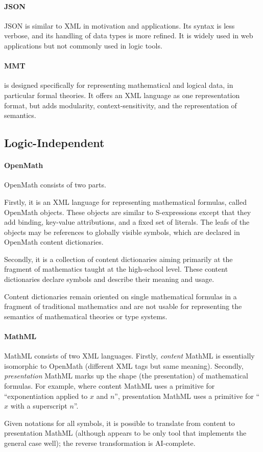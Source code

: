 \documentclass[12pt]{article}
\newcommand{\system}[2][]{\paragraph{#2}#2 \ifnonempty[\cite{#2}]{#1}{\cite{#1}}}
\begin{document}
\system{JSON}
is similar to XML in motivation and applications.
Its syntax is less verbose, and its handling of data types is more refined.
It is widely used in web applications but not commonly used in logic tools.

\paragraph{MMT}
\mmt is designed specifically for representing mathematical and logical data, in particular formal theories.
It offers an XML language as one representation format, but adds modularity, context-sensitivity, and the representation of semantics.

\subsection{Logic-Independent}

\system{OpenMath} consists of two parts.

Firstly, it is an XML language for representing mathematical formulas, called OpenMath objects.
These objects are similar to S-expressions except that they add binding, key-value attributions, and a fixed set of literals.
The leafs of the objects may be references to globally visible symbols, which are declared in OpenMath content dictionaries.

Secondly, it is a collection of content dictionaries aiming primarily at the fragment of mathematics taught at the high-school level.
These content dictionaries declare symbols and describe their meaning and usage.

Content dictionaries remain oriented on single mathematical formulas in a fragment of traditional mathematics and are not usable for representing the semantics of mathematical theories or type systems.

\system{MathML} consists of two XML languages.
Firstly, \emph{content} MathML is essentially isomorphic to OpenMath (different XML tags but same meaning).
Secondly, \emph{presentation} MathML marks up the shape (the presentation) of mathematical formulas.
For example, where content MathML uses a primitive for ``exponentiation applied to $x$ and $n$'', presentation MathML uses a primitive for ``$x$ with a superscript $n$''.

Given notations for all symbols, it is possible to translate from content to presentation MathML (although \mmt appears to be only tool that implements the general case well); the reverse transformation is AI-complete.
\end{document}
